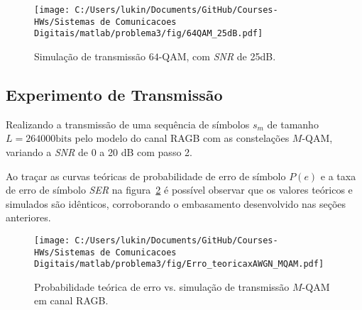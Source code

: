\begin{figure}[!ht]
    \centering
    \texttt{[image: C:/Users/lukin/Documents/GitHub/Courses-HWs/Sistemas de Comunicacoes Digitais/matlab/problema3/fig/64QAM\_25dB.pdf]}
    \caption{Simulação de transmissão $64$-QAM, com \textit{SNR} de 25dB.}
    \label{fig:64QAM_25dB}
\end{figure}

\clearpage

\subsection{Experimento de Transmissão}
Realizando a transmissão de uma sequência de símbolos $s_m$ de tamanho $L = 264000 \text{bits}$ pelo modelo do canal RAGB com as constelações $M$-QAM, variando a \textit{SNR} de 0 a 20 dB com passo 2.

Ao traçar as curvas teóricas de probabilidade de erro de símbolo $P(e)$ e a taxa de erro de símbolo \textit{SER} na figura~\ref{fig:Erro_teoricaxAWGN_MQAM} é possível observar que os valores teóricos e simulados são idênticos, corroborando o embasamento desenvolvido nas seções anteriores.

\begin{figure}[!ht]
    \centering
    \texttt{[image: C:/Users/lukin/Documents/GitHub/Courses-HWs/Sistemas de Comunicacoes Digitais/matlab/problema3/fig/Erro\_teoricaxAWGN\_MQAM.pdf]}
    \caption{Probabilidade teórica de erro vs. simulação de transmissão $M$-QAM em canal RAGB.}
    \label{fig:Erro_teoricaxAWGN_MQAM}
\end{figure}